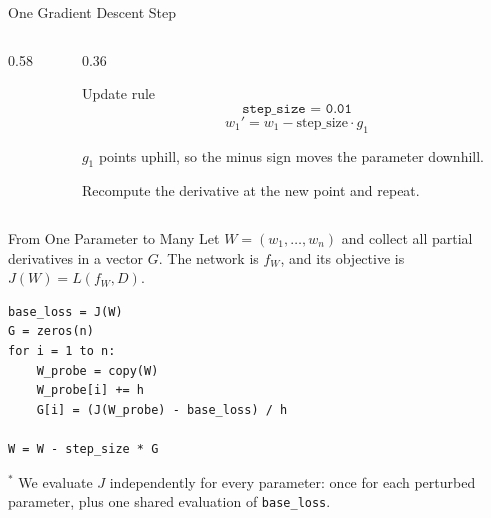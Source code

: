 \documentclass[aspectratio=169]{beamer}
\begin{document}
\begin{frame}{One Gradient Descent Step}
  \begin{columns}[c]
    \begin{column}{0.58\textwidth}
      \centering
    \end{column}
    \begin{column}{0.36\textwidth}
      \begin{block}{Update rule}
        \begin{equation*}
          \texttt{step\_size = 0.01}
        \end{equation*}
        \begin{equation*}
          w_1' = w_1 - \text{step\_size} \cdot g_1
        \end{equation*}
      \end{block}

      $g_1$ points uphill, so the minus sign moves the parameter downhill.

      Recompute the derivative at the new point and repeat.
    \end{column}
  \end{columns}
\end{frame}

\begin{frame}[fragile]{From One Parameter to Many}
  \small
  Let $W = (w_1, \ldots, w_n)$ and collect all partial derivatives in a vector
  $G$. The network is $f_W$, and its objective is $J(W)=L(f_W,D)$.

\begin{verbatim}
base_loss = J(W)
G = zeros(n)
for i = 1 to n:
    W_probe = copy(W)
    W_probe[i] += h
    G[i] = (J(W_probe) - base_loss) / h

W = W - step_size * G
\end{verbatim}

  {\footnotesize
    $^{*}$ We evaluate $J$ independently for every parameter: once for each
    perturbed parameter, plus one shared evaluation of \texttt{base\_loss}.
  }
\end{frame}
\end{document}
